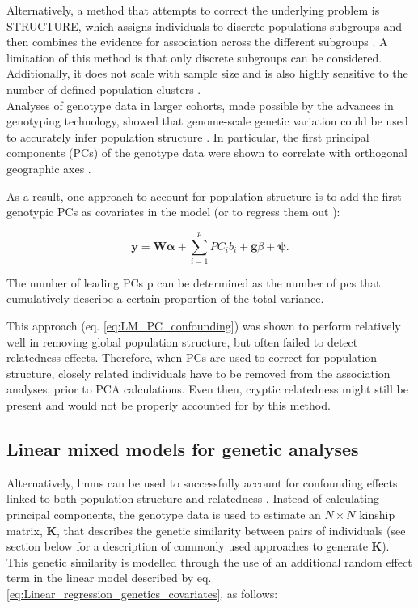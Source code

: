 Alternatively, a method that attempts to correct the underlying problem is STRUCTURE, which assigns individuals to discrete populations subgroups and then combines the evidence for association across the different subgroups \cite{pritchard2000inference}. 
A limitation of this method is that only discrete subgroups can be considered. 
Additionally, it does not scale with sample size and is also highly sensitive to the number of defined population clusters \cite{price2006principal}.\\


Analyses of genotype data in larger cohorts, made possible by the advances in
genotyping technology, showed that genome-scale genetic variation could be used to
accurately infer population structure 
\cite{li2008worldwide, tian2008analysis, price2008discerning}.
In particular, the first principal components (PCs) of the genotype data were shown to correlate with orthogonal geographic axes
\cite{novembre2008interpreting}.

As a result, one approach to account for population structure is to add the first genotypic PCs as covariates in the model (or to regress them out \cite{price2006principal}): 

\begin{equation}\label{eq:LM_PC_confounding}
    \mathbf{y} =  \mathbf{W}\boldsymbol{\alpha} + \sum_{i=1}^{p} PC_i b_i + \mathbf{g}\beta + \boldsymbol{\psi}. 
\end{equation}

The number of leading PCs p can be determined as the number of \gls{pc}s that cumulatively describe a certain proportion of the total variance.

This approach (eq. \eqref{eq:LM_PC_confounding}) was shown to perform relatively well in removing global population structure, but often failed to detect relatedness effects.
Therefore, when PCs are used to correct for population structure, closely related individuals have to be removed from the association analyses, prior to PCA calculations.
Even then, cryptic relatedness might still be present and would not be properly accounted for by this method. 

\subsection{Linear mixed models for genetic analyses}
\label{sec:LMM}

Alternatively, \gls{lmm}s can be used to successfully account for confounding effects linked to both population structure and relatedness 
\cite{yu2006unified, kang2008efficient,kang2010variance, price2010new, zhou2012genome, lee2018genome}.
Instead of calculating principal components, the genotype data is used to estimate an $N \times N$ kinship matrix, $\mathbf{K}$, that describes the genetic similarity between pairs of individuals (see section below for a description of commonly used approaches to generate $\mathbf{K}$). 
This genetic similarity is modelled through the use of an additional random
effect term in the linear model described by eq. \eqref{eq:Linear_regression_genetics_covariates}, as follows:

